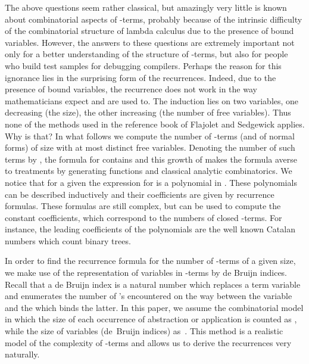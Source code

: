 \documentclass{jfp1}
\begin{document}
The above questions seem rather classical, but amazingly very little is known about
combinatorial aspects of -terms, probably because of the intrinsic difficulty of
the combinatorial structure of lambda calculus due to the presence of bound
variables.    However, the answers to these questions are extremely
important not only for a better understanding of the structure of -terms, but also
for people who build test samples for debugging compilers.  Perhaps the
reason for this ignorance lies in the surprising form of the recurrences.  Indeed, due to the
presence of bound variables, the recurrence does not work in the way mathematicians expect
and are used to.  The induction lies on two variables, one decreasing (the size),
the other increasing (the number of free variables). 
Thus none of the methods used in the reference book of
Flajolet and Sedgewick \cite{flajolet08:_analy_combin} applies.  Why is that?  In what
follows we compute the number of -terms (and of normal forms) of size  with at
most  distinct free variables.  Denoting the number of such terms by , the formula for
 contains  and this growth of  makes the formula averse to
treatments by generating functions and classical analytic combinatorics.  We notice that
for a given  the expression for  is a polynomial in .  These polynomials can
be described inductively and their coefficients are given by recurrence formulas.  These formulas
are still complex, but can be used to compute the constant coefficients, which correspond
to the numbers of closed -terms.  For instance, the leading coefficients of the
polynomials are the well known Catalan numbers which count binary trees.

In order to find the recurrence formula for the number of \mbox{-terms} of a
given size, we make use of the representation of variables in -terms by de Bruijn
indices.  Recall that a de Bruijn index is a natural number which replaces a term
variable and enumerates the number of 's encountered on the way between the
variable and the  which binds the latter.  In this paper, we assume the
combinatorial model in which the size of each occurrence of abstraction or
application is counted as , while the size of variables (de~Bruijn indices)
as~.  This method is a realistic model of the complexity of -terms and allows
us to derive the recurrences very naturally.  
\end{document}
